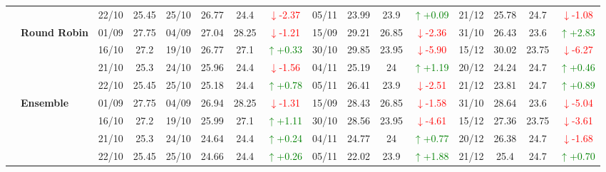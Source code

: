 {\begin{longtable}{llcc|cccc|cccc|cccc}
&
& 22/10 & 25.45 & 25/10 & 26.77 & 24.4 & \textcolor{red}{\(\downarrow\)-2.37} & 05/11 & 23.99 & 23.9 & \textcolor{green}{\(\uparrow\)+0.09} & 21/12 & 25.78 & 24.7 & \textcolor{red}{\(\downarrow\)-1.08} \\
\cmidrule(lr){2-16}


& \textbf{Round Robin}
& 01/09 & 27.75 & 04/09 & 27.04 & 28.25 & \textcolor{red}{\(\downarrow\)-1.21} & 15/09 & 29.21 & 26.85 & \textcolor{red}{\(\downarrow\)-2.36} & 31/10 & 26.43 & 23.6 & \textcolor{green}{\(\uparrow\)+2.83} \\

&
& 16/10 & 27.2 & 19/10 & 26.77 & 27.1 & \textcolor{green}{\(\uparrow\)+0.33} & 30/10 & 29.85 & 23.95 & \textcolor{red}{\(\downarrow\)-5.90} & 15/12 & 30.02 & 23.75 & \textcolor{red}{\(\downarrow\)-6.27} \\

&
& 21/10 & 25.3 & 24/10 & 25.96 & 24.4 & \textcolor{red}{\(\downarrow\)-1.56} & 04/11 & 25.19 & 24 & \textcolor{green}{\(\uparrow\)+1.19} & 20/12 & 24.24 & 24.7 & \textcolor{green}{\(\uparrow\)+0.46} \\

&
& 22/10 & 25.45 & 25/10 & 25.18 & 24.4 & \textcolor{green}{\(\uparrow\)+0.78} & 05/11 & 26.41 & 23.9 & \textcolor{red}{\(\downarrow\)-2.51} & 21/12 & 23.81 & 24.7 & \textcolor{green}{\(\uparrow\)+0.89} \\
\cmidrule(lr){2-16}



& \textbf{Ensemble}
& 01/09 & 27.75 & 04/09 & 26.94 & 28.25 & \textcolor{red}{\(\downarrow\)-1.31} & 15/09 & 28.43 & 26.85 & \textcolor{red}{\(\downarrow\)-1.58} & 31/10 & 28.64 & 23.6 & \textcolor{red}{\(\downarrow\)-5.04} \\

&
& 16/10 & 27.2 & 19/10 & 25.99 & 27.1 & \textcolor{green}{\(\uparrow\)+1.11} & 30/10 & 28.56 & 23.95 & \textcolor{red}{\(\downarrow\)-4.61} & 15/12 & 27.36 & 23.75 & \textcolor{red}{\(\downarrow\)-3.61} \\

&
& 21/10 & 25.3 & 24/10 & 24.64 & 24.4 & \textcolor{green}{\(\uparrow\)+0.24} & 04/11 & 24.77 & 24 & \textcolor{green}{\(\uparrow\)+0.77} & 20/12 & 26.38 & 24.7 & \textcolor{red}{\(\downarrow\)-1.68} \\

&
& 22/10 & 25.45 & 25/10 & 24.66 & 24.4 & \textcolor{green}{\(\uparrow\)+0.26} & 05/11 & 22.02 & 23.9 & \textcolor{green}{\(\uparrow\)+1.88} & 21/12 & 25.4 & 24.7 & \textcolor{green}{\(\uparrow\)+0.70} \\


\bottomrule
\end{longtable}
}